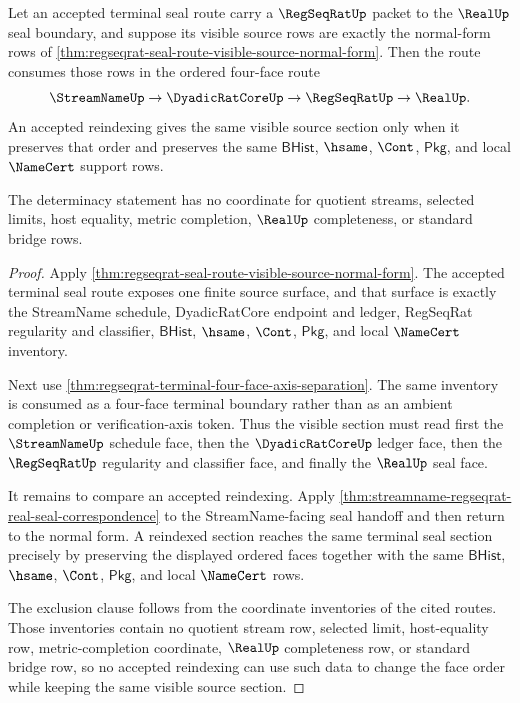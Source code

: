 \begin{theorem}\label{thm:regseqrat-seal-route-ordered-face-determinacy}
Let an accepted terminal seal route carry a $\RegSeqRatUp$ packet to the
$\RealUp$ seal boundary, and suppose its visible source rows are exactly the
normal-form rows of
\autoref{thm:regseqrat-seal-route-visible-source-normal-form}. Then the
route consumes those rows in the ordered four-face route
$$
\StreamNameUp \to \DyadicRatCoreUp \to \RegSeqRatUp \to \RealUp.
$$
An accepted reindexing gives the same visible source section only when it
preserves that order and preserves the same $\mathsf{BHist}$, $\hsame$,
$\Cont$, $\mathsf{Pkg}$, and local $\NameCert$ support rows.

The determinacy statement has no coordinate for quotient streams, selected
limits, host equality, metric completion, $\RealUp$ completeness, or standard
bridge rows.
\end{theorem}
\begin{proof}
Apply \autoref{thm:regseqrat-seal-route-visible-source-normal-form}. The
accepted terminal seal route exposes one finite source surface, and that
surface is exactly the StreamName schedule, DyadicRatCore endpoint and ledger,
RegSeqRat regularity and classifier, $\mathsf{BHist}$, $\hsame$, $\Cont$,
$\mathsf{Pkg}$, and local $\NameCert$ inventory.

Next use \autoref{thm:regseqrat-terminal-four-face-axis-separation}. The same
inventory is consumed as a four-face terminal boundary rather than as an
ambient completion or verification-axis token. Thus the visible section must
read first the $\StreamNameUp$ schedule face, then the $\DyadicRatCoreUp$
ledger face, then the $\RegSeqRatUp$ regularity and classifier face, and
finally the $\RealUp$ seal face.

It remains to compare an accepted reindexing. Apply
\autoref{thm:streamname-regseqrat-real-seal-correspondence} to the
StreamName-facing seal handoff and then return to the normal form. A
reindexed section reaches the same terminal seal section precisely by
preserving the displayed ordered faces together with the same $\mathsf{BHist}$,
$\hsame$, $\Cont$, $\mathsf{Pkg}$, and local $\NameCert$ rows.

The exclusion clause follows from the coordinate inventories of the cited
routes. Those inventories contain no quotient stream row, selected limit,
host-equality row, metric-completion coordinate, $\RealUp$ completeness row,
or standard bridge row, so no accepted reindexing can use such data to change
the face order while keeping the same visible source section.
\end{proof}
